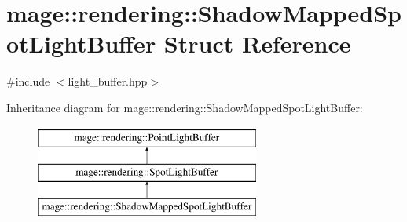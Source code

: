 \hypertarget{structmage_1_1rendering_1_1_shadow_mapped_spot_light_buffer}{}\section{mage\+:\+:rendering\+:\+:Shadow\+Mapped\+Spot\+Light\+Buffer Struct Reference}
\label{structmage_1_1rendering_1_1_shadow_mapped_spot_light_buffer}


{\ttfamily \#include $<$light\+\_\+buffer.\+hpp$>$}

Inheritance diagram for mage\+:\+:rendering\+:\+:Shadow\+Mapped\+Spot\+Light\+Buffer\+:\begin{figure}[H]
\begin{center}
\leavevmode
\includegraphics[height=3.000000cm]{structmage_1_1rendering_1_1_shadow_mapped_spot_light_buffer}
\end{center}
\end{figure}
